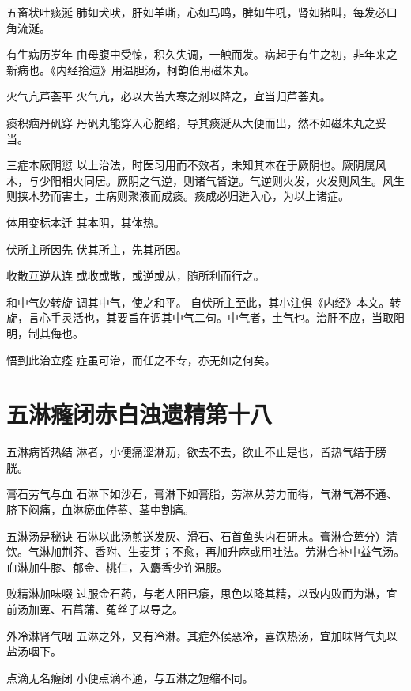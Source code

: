 \documentclass[a4paper,12pt,UTF8,twoside]{ctexbook}
\begin{document}
    五畜状吐痰涎
    肺如犬吠，肝如羊嘶，心如马鸣，脾如牛吼，肾如猪叫，每发必口角流涎。
    
    有生病历岁年
    由母腹中受惊，积久失调，一触而发。病起于有生之初，非年来之新病也。《内经拾遗》用温胆汤，柯韵伯用磁朱丸。
    
    火气亢芦荟平
    火气亢，必以大苦大寒之剂以降之，宜当归芦荟丸。
    
    痰积痼丹矾穿
    丹矾丸能穿入心胞络，导其痰涎从大便而出，然不如磁朱丸之妥当。
    
    三症本厥阴愆
    以上治法，时医习用而不效者，未知其本在于厥阴也。厥阴属风木，与少阳相火同居。厥阴之气逆，则诸气皆逆。气逆则火发，火发则风生。风生则挟木势而害土，土病则聚液而成痰。痰成必归迸入心，为以上诸症。
    
    体用变标本迁
    其本阴，其体热。
    
    伏所主所因先
    伏其所主，先其所因。
    
    收散互逆从连
    或收或散，或逆或从，随所利而行之。
    
    和中气妙转旋
    调其中气，使之和平。
    自伏所主至此，其小注俱《内经》本文。转旋，言心手灵活也，其要旨在调其中气二句。中气者，土气也。治肝不应，当取阳明，制其侮也。
    
    悟到此治立痊
    症虽可治，而任之不专，亦无如之何矣。
    
    
    
    
    \chapter{五淋癃闭赤白浊遗精第十八}
        
    五淋病皆热结
    淋者，小便痛涩淋沥，欲去不去，欲止不止是也，皆热气结于膀胱。
    
    膏石劳气与血
    石淋下如沙石，膏淋下如膏脂，劳淋从劳力而得，气淋气滞不通、脐下闷痛，血淋瘀血停蓄、茎中割痛。
    
    五淋汤是秘诀
    石淋以此汤煎送发灰、滑石、石首鱼头内石研末。膏淋合萆分）清饮。气淋加荆芥、香附、生麦芽；不愈，再加升麻或用吐法。劳淋合补中益气汤。血淋加牛膝、郁金、桃仁，入麝香少许温服。
    
    败精淋加味啜
    过服金石药，与老人阳已痿，思色以降其精，以致内败而为淋，宜前汤加萆、石菖蒲、菟丝子以导之。
    
    外冷淋肾气咽
    五淋之外，又有冷淋。其症外候恶冷，喜饮热汤，宜加味肾气丸以盐汤咽下。
    
    点滴无名癃闭
    小便点滴不通，与五淋之短缩不同。
    
\end{document}
